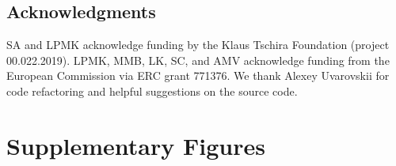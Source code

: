 \documentclass[twocolumn,10pt]{article}
\begin{document}
\subsection{Acknowledgments}

SA and LPMK acknowledge funding by the Klaus Tschira Foundation (project 00.022.2019).
LPMK, MMB, LK, SC, and AMV acknowledge funding from the European Commission via ERC grant 771376.
We thank Alexey Uvarovskii for code refactoring and helpful suggestions on the source code.
\bigskip

{
\small \balance  \balance}

\onecolumn 
\newpage
\section{Supplementary Figures}
\vspace{1.5cm}

\setcounter{figure}{0}
\renewcommand{\thefigure}{S\arabic{figure}}
\end{document}

